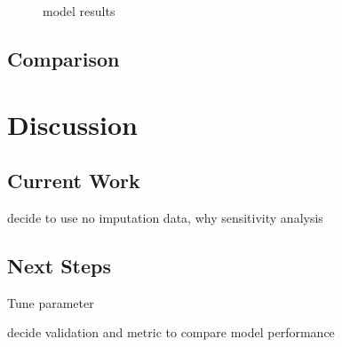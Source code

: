 \documentclass[
]{article}
\begin{document}
\begin{figure}[H]

{\centering {}\newline{}

}

\caption{model results}\label{fig:ml2}
\end{figure}

\subsection{Comparison}\label{comparison}

\section{Discussion}\label{discussion}

\subsection{Current Work}\label{current-work}

decide to use no imputation data, why
sensitivity analysis

\subsection{Next Steps}\label{next-steps}

Tune parameter

decide validation and metric to compare model performance
\end{document}
